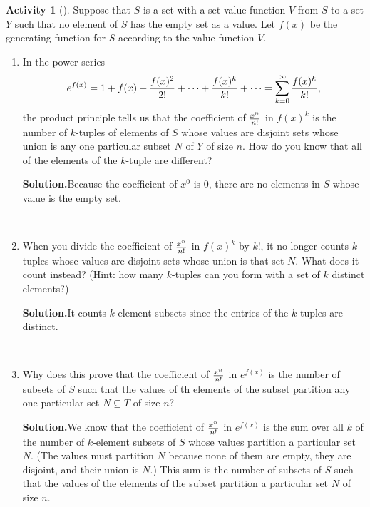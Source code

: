 \documentclass[10pt,]{book}
\theoremstyle{plain}
\theoremstyle{definition}
\newtheorem{activity}[project]{Activity}
\numberwithin{equation}{chapter}
\begin{document}
\begin{activity}[]\label{exponentialformula}
Suppose that \(S\) is a set with a set-value function \(V\) from \(S\) to a set \(Y\) such that no element of \(S\) has the empty set as a value. Let \(f(x)\) be the generating function for \(S\) according to the value function \(V\).%
~\par
\begin{enumerate}[label=(\alph*)]
 \item In the power series%
\begin{equation*}
e^{f(x)} = 1 + f(x) + {f(x)^2\over 2!} +
\cdots + {f(x)^k\over k!} + \cdots= \sum_{k=0}^\infty {f(x)^k\over k!},
\end{equation*}
the product principle tells us that the coefficient of \(x^n\over n!\) in \(f(x)^k\) is the number of \(k\)-tuples of elements of \(S\) whose values are disjoint sets whose union is any one particular subset \(N\) of \(Y\) of size \(n\).  How do you know that all of the elements of the \(k\)-tuple are different?%
\par\medskip\noindent%
\textbf{Solution.}\quad Because the coefficient of \(x^0\) is 0, there are no elements in \(S\) whose value is the empty set.%

~\par
\item When you divide the coefficient of \(x^n\over n!\) in \(f(x)^k\) by \(k!\), it no longer counts \(k\)-tuples whose values are disjoint sets whose union is that set \(N\).  What does it count instead?  (Hint: how many \(k\)-tuples can you form with a set of \(k\) distinct elements?)%
\par\medskip\noindent%
\textbf{Solution.}\quad It counts \(k\)-element subsets since the entries of the \(k\)-tuples are distinct.%

~\par
\item Why does this prove that the coefficient of \(x^n\over n!\) in \(e^{f(x)}\) is the number of subsets of \(S\) such that the values of th elements of the subset partition any one particular set \(N\subseteq T\) of size \(n\)?%
\par\medskip\noindent%
\textbf{Solution.}\quad We know that the coefficient of \(x^n\over n!\) in \(e^{f(x)}\) is the sum over all \(k\) of the number of \(k\)-element subsets of \(S\) whose values partition a particular set \(N\). (The values must partition \(N\) because none of them are empty, they are disjoint, and their union is \(N\).) This sum is the number of subsets of \(S\) such that the values of the elements of the subset partition a particular set \(N\) of size \(n\).%

\end{enumerate}
\end{activity}
\end{document}
